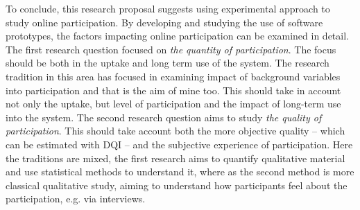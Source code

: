 \documentclass[journal,a4paper]{IEEEtran}
\begin{document}
To conclude, this research proposal suggests using experimental approach to study online participation. By developing and studying the use of software prototypes, the factors impacting online participation can be examined in detail.
The first research question focused on \textit{the quantity of participation}. The focus should be both in the uptake and long term use of the system. The research tradition in this area has focused in examining impact of background variables into participation and that is the aim of mine too. This should take in account not only the uptake, but level of participation and the impact of long-term use into the system.
The second research question aims to study \textit{the quality of participation}. This should take account both the more objective quality -- which can be estimated with DQI -- and the subjective experience of participation. Here the traditions are mixed, the first research aims to quantify qualitative material and use statistical methods to understand it, where as the second method is more classical qualitative study, aiming to understand how participants feel about the participation, e.g. via interviews.



\end{document}
